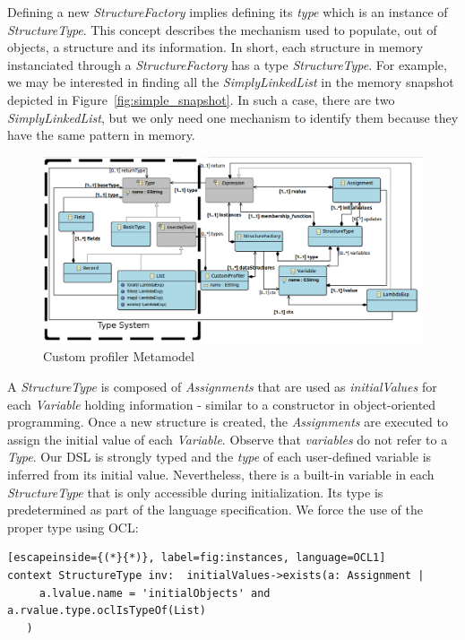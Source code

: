Defining a new \textit{StructureFactory} implies defining its \textit{type} which is an instance of \textit{StructureType}.
This concept describes the mechanism used to populate, out of objects, a structure and its information.
In short, each structure in memory instanciated through a \textit{StructureFactory} has a type \textit{StructureType}.
For example, we may be interested in finding all the \textit{SimplyLinkedList} in the memory snapshot depicted in Figure~\ref{fig:simple_snapshot}.
In such a case, there are two \textit{SimplyLinkedList}, but we only need one mechanism to identify them because they have the same pattern in memory. 

\begin{figure}
\centering
\includegraphics[width=0.87\linewidth]{chapter6/fig/AS}
\caption{Custom profiler Metamodel}
\label{fig:as}
\end{figure}


A \textit{StructureType} is composed of \textit{Assignments} that are used as \textit{initialValues} for each \textit{Variable} holding information - similar to a constructor in object-oriented programming.
Once a new structure is created, the \textit{Assignments} are executed to assign the initial value of each \textit{Variable}.
Observe that \textit{variables} do not refer to a \textit{Type}.
Our DSL is strongly typed and the \textit{type} of each user-defined variable is inferred from its initial value.
Nevertheless, there is a built-in variable in each \textit{StructureType} that is only accessible during initialization.
Its type is predetermined as part of the language specification.
We force the use of the proper type using OCL:

\begin{lstlisting}[escapeinside={(*}{*)}, label=fig:instances, language=OCL1]
context StructureType inv:  initialValues->exists(a: Assignment | 
     a.lvalue.name = 'initialObjects' and a.rvalue.type.oclIsTypeOf(List)
   ) 
\end{lstlisting}

